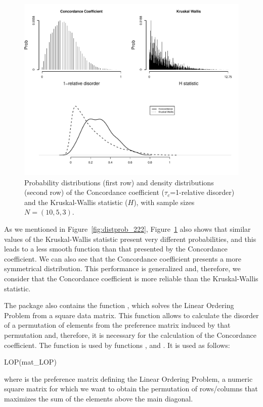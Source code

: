 \begin{figure}[h]
\centering
\includegraphics[width=11.5cm]{ProbabilityAndDensityDistributions}
\caption{\label{fig:1053} Probability distributions (first row) and density distributions (second row) of the Concordance coefficient ($\tau_c$=1-relative disorder) and the Kruskal-Wallis statistic ($H$), with sample sizes $N=(10,5,3)$.}
\end{figure}

As we mentioned in Figure~\ref{fig:distprob_222}, Figure~\ref{fig:1053} also shows that similar values of the Kruskal-Wallis statistic present very different probabilities, and this leads to a less smooth function than that presented by the Concordance coefficient. We can also see that the Concordance coefficient presents a more symmetrical distribution. This performance is generalized and, therefore, we consider that the Concordance coefficient is more reliable than the Kruskal-Wallis statistic.

The  package also contains the function , which solves the Linear Ordering Problem from a square data matrix. This function allows to calculate the disorder of a permutation of elements from the preference matrix induced by that permutation and, therefore, it is necessary for the calculation of the Concordance coefficient. The function  is used by functions ,  and . It is used as follows: 
\begin{example}
LOP(mat_LOP)
\end{example}
where  is the preference matrix defining the Linear Ordering Problem, a numeric square matrix for which we want to obtain the permutation of rows/columns that maximizes the sum of the elements above the main diagonal.


